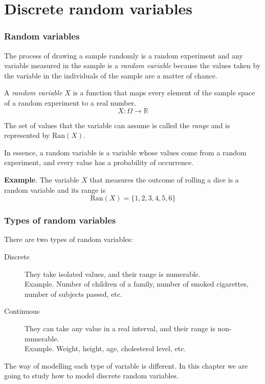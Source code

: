 \section{Discrete random variables}



\begin{frame}
\frametitle{Random variables}
The process of drawing a sample randomly is a random experiment and any variable measured in the sample is a \emph{random variable} because the values taken by the variable in the individuals of the sample are a matter of chance.

\begin{definition} 
A \emph{random variable} $X$ is a function that maps every element of the sample space of a random experiment to a real number.
\[ 
X:\Omega \rightarrow \mathbb{R} 
\]

The set of values that the variable can assume is called the \emph{range} and is represented by $\mbox{Ran}(X)$.
\end{definition}

In essence, a random variable is a variable whose values come from a random experiment, and every value has a probability of occurrence. 

\textbf{Example}. The variable $X$ that measures the outcome of rolling a dice is a random variable and its range is 
\[
\mbox{Ran}(X)=\{1,2,3,4,5,6\}
\]
\end{frame}


\begin{frame}
\frametitle{Types of random variables}
There are two types of random variables:
\begin{description}
\item[Discrete] They take isolated values, and their range is numerable.\\
Example. Number of children of a family, number of smoked cigarettes, number of subjects passed, etc.
\item[Continuous] They can take any value in a real interval, and their range is non-numerable.\\
Example. Weight, height, age, cholesterol level, etc. 
\end{description}

The way of modelling each type of variable is different. 
In this chapter we are going to study how to model discrete random variables.
\end{frame}


